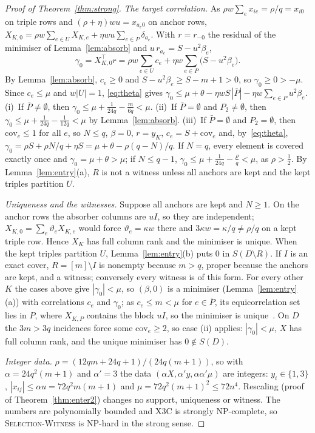 \documentclass[10pt,a4paper]{article}
\theoremstyle{plain}
\theoremstyle{definition}
\theoremstyle{remark}
\newcommand{\Dm}{D\setminus R}
\newcommand{\tsc}[1]{\textnormal{\textsc{#1}}}  %
\begin{document}
\begin{proof}[Proof of Theorem~\ref{thm:strong}]
\emph{The target correlation.} As $\rho w\sum_ex_{ie}=\rho/q=x_{i0}$ on triple rows and $(\rho+\eta)wu=x_{a_e0}$ on anchor rows, $X_{K,0}=\rho w\sum_{e\in U}X_{K,e}+\eta wu\sum_{e\in P}\delta_{a_e}$. With $r=r_{-0}$ the residual of the minimiser of Lemma~\ref{lem:absorb} and $u\,r_{a_e}=S-u^2\beta_e$,
\[
\gamma_0=X_{K,0}^{\top}r=\rho w\sum_{e\in U}c_e+\eta w\sum_{e\in P}\bigl(S-u^2\beta_e\bigr).
\]
By Lemma~\ref{lem:absorb}, $c_e\ge0$ and $S-u^2\beta_e\ge S-m+1>0$, so $\gamma_0\ge0>-\mu$. Since $c_e\le\mu$ and $w|U|=1$, \eqref{eq:theta} gives $\gamma_0\le\mu+\theta-\eta wS\,|\bar P|-\eta w\sum_{e\in P}u^2\beta_e$. (i)~If $\bar P\ne\emptyset$, then $\gamma_0\le\mu+\frac1{24q}-\frac{m}{6q}<\mu$. (ii)~If $\bar P=\emptyset$ and $P_2\ne\emptyset$, then $\gamma_0\le\mu+\frac1{24q}-\frac1{12q}<\mu$ by Lemma~\ref{lem:absorb}. (iii)~If $\bar P=\emptyset$ and $P_2=\emptyset$, then $\mathrm{cov}_e\le1$ for all $e$, so $N\le q$, $\beta=0$, $r=y_K$, $c_e=S+\mathrm{cov}_e$ and, by~\eqref{eq:theta}, $\gamma_0=\rho S+\rho N/q+\eta S=\mu+\theta-\rho(q-N)/q$. If $N=q$, every element is covered exactly once and $\gamma_0=\mu+\theta>\mu$; if $N\le q-1$, $\gamma_0\le\mu+\frac1{24q}-\frac\rho q<\mu$, as $\rho>\frac12$. By Lemma~\ref{lem:entry}(a), $R$ is not a witness unless all anchors are kept and the kept triples partition $U$.

\emph{Uniqueness and the witnesses.} Suppose all anchors are kept and $N\ge1$. On the anchor rows the absorber columns are $uI$, so they are independent; $X_{K,0}=\sum_e\vartheta_eX_{K,e}$ would force $\vartheta_e=\kappa w$ there and $3\kappa w=\kappa/q\ne\rho/q$ on a kept triple row. Hence $X_K$ has full column rank and the minimiser is unique. When the kept triples partition $U$, Lemma~\ref{lem:entry}(b) puts $0$ in $S(\Dm)$. If $I$ is an exact cover, $R=[m]\setminus I$ is nonempty because $m>q$, proper because the anchors are kept, and a witness; conversely every witness is of this form. For every other $K$ the cases above give $|\gamma_0|<\mu$, so $(\beta,0)$ is a minimiser (Lemma~\ref{lem:entry}(a)) with correlations $c_e$ and $\gamma_0$; as $c_e\le m<\mu$ for $e\in\bar P$, its equicorrelation set lies in $P$, where $X_{K,P}$ contains the block $uI$, so the minimiser is unique~\citep{tibshirani2013}. On $D$ the $3m>3q$ incidences force some $\mathrm{cov}_e\ge2$, so case (ii) applies: $|\gamma_0|<\mu$, $X$ has full column rank, and the unique minimiser has $0\notin S(D)$.

\emph{Integer data.} $\rho=(12qm+24q+1)/(24q(m+1))$, so with $\alpha=24q^2(m+1)$ and $\alpha'=3$ the data $(\alpha X,\alpha'y,\alpha\alpha'\mu)$ are integers: $y_i\in\{1,3\}$, $|x_{ij}|\le\alpha u=72q^2m(m+1)$ and $\mu=72q^2(m+1)^2\le72n^4$. Rescaling (proof of Theorem~\ref{thm:enter2}) changes no support, uniqueness or witness. The numbers are polynomially bounded and \tsc{X3C} is strongly NP-complete, so \tsc{Selection-Witness} is NP-hard in the strong sense.


\end{proof}
\end{document}
